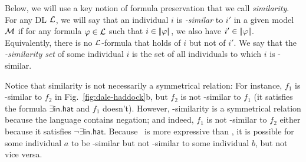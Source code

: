 Below, we will use a key notion of formula preservation that we call
\emph{similarity}.  For any DL $\mathcal{L}$, we will say that
an individual $i$ is \emph{\gL-similar} to $i'$ in a given model $\mathcal{M}$
if for any formula $\varphi \in \mathcal{L}$ such that $i \in
|\!|\varphi|\!|$, we also have $i' \in |\!|\varphi|\!|$.
Equivalently, there is no $\mathcal{L}$-formula that holds of $i$ but not of
$i'$.  We say that the \emph{\gL-similarity set} of some individual
$i$ is the set of all individuals to which $i$ is \gL-similar.

Notice that similarity is not necessarily a symmetrical relation: For
instance, $f_1$ is \el-similar to $f_2$ in
Fig.~\ref{fig:dale-haddock}b, but $f_2$ is not \el-similar to $f_1$
(it satisfies the formula $\exists \mathsf{in}.\mathsf{hat}$ and $f_1$
doesn't).  However, \alc-similarity is a symmetrical relation because
the language contains negation; and indeed, $f_1$ is not \alc-similar
to $f_2$ either because it satisfies $\neg \exists
\mathsf{in}.\mathsf{hat}$.  Because \alc\ is more expressive than \el,
it is  possible for some individual $a$ to be \el-similar but
not \alc-similar to some individual $b$, but not vice versa.


